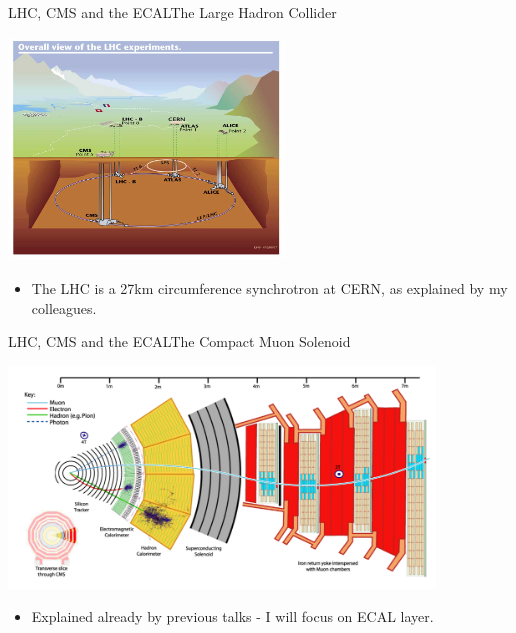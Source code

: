 \documentclass{beamer}
\begin{document}
\begin{frame}{LHC, CMS and the ECAL}{The Large Hadron Collider}
\begin{center}
\includegraphics[width=0.55\textwidth]{"LHC"}
\end{center}
  \begin{itemize}
\item {\footnotesize The LHC is a 27km circumference synchrotron at CERN, as explained by my colleagues.}
  \end{itemize}
\end{frame}
\begin{frame}{LHC, CMS and the ECAL}{The Compact Muon Solenoid}
\begin{center}
\includegraphics[width=0.85\textwidth]{"CMSLayout"}
\end{center}
  \begin{itemize}
\item {\footnotesize Explained already by previous talks - I will focus on ECAL layer.\\}
  \end{itemize}
\end{frame}
\end{document}
